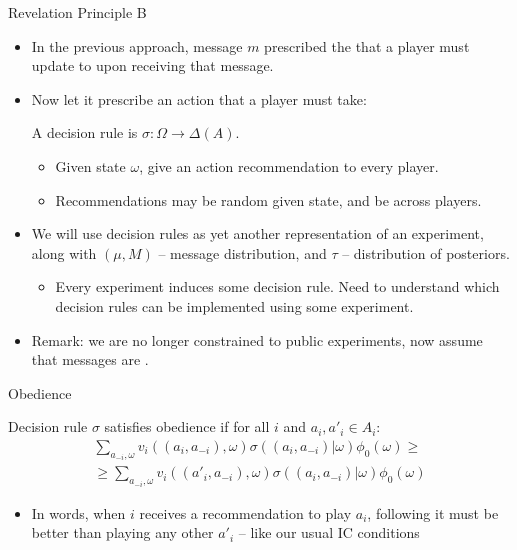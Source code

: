\documentclass[english,10pt
,aspectratio=169
]{beamer}
\begin{document}
\begin{frame}{Revelation Principle B}
\begin{itemize}
	\item In the previous approach, message $m$ prescribed the  that a player must update to upon receiving that message.
	\item Now let it prescribe an \alert{action} that a player must take: 
	
	A \alert{decision rule} is $\sigma: \Omega \to \varDelta(A)$.
	\begin{itemize}
		\item Given state $\omega$, give an action recommendation to every player.
		\item Recommendations may be random given state, and be  across players.
	\end{itemize}
	\item We will use decision rules as yet another representation of an experiment, along with $(\mu,M)$ -- message distribution, and $\tau$ -- distribution of posteriors.
	\begin{itemize}
		\item Every experiment induces some decision rule. Need to understand which decision rules can be implemented using some experiment.
	\end{itemize}
	\item Remark: we are no longer constrained to public experiments, now assume that messages are .
\end{itemize}
\end{frame}


\begin{frame}{Obedience}
\begin{definition}
	Decision rule $\sigma$ satisfies \alert{obedience} if for all $i$ and $a_i,a'_i \in A_i$:
	\begin{align*}
		\sum_{a_{-i},\omega} v_i ((a_i,a_{-i}), \omega) \sigma ((a_i,a_{-i}) | \omega) \phi_0(\omega) \geq
		\\
		\geq \sum_{a_{-i},\omega} v_i ((a'_i,a_{-i}), \omega) \sigma ((a_i,a_{-i}) | \omega) \phi_0(\omega) 
	\end{align*} 
\end{definition}
\begin{itemize}
	\item In words, when $i$ receives a recommendation to play $a_i$, following it must be better than playing any other $a'_i$ -- like our usual IC conditions
\end{itemize}
\end{frame}
\end{document}
